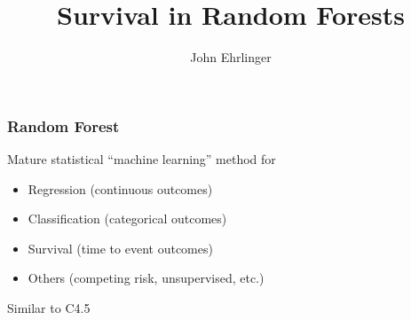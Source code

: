 \documentclass[xcolor=svgnames]{beamer}\usepackage[]{graphicx}\usepackage[]{color}
\title{Survival in Random Forests}
\author[J. Ehrlinger]{John Ehrlinger}
\institute[Cleveland Clinic] %
{
Department of Quantitative Health Sciences\\
Lerner Research Institute\\
Cleveland Clinic\\
john.ehrlinger@gmail.com
}
\date[\today]
\begin{document}
\frame{\titlepage}

\begin{frame}
\frametitle{Random Forest}

Mature statistical ``machine learning'' method for
\begin{itemize}
\item Regression (continuous outcomes)
\item Classification (categorical outcomes)
\item Survival (time to event outcomes)
\item Others (competing risk, unsupervised, etc.)
\end{itemize}

Similar to C4.5

\end{frame}







\end{document}
